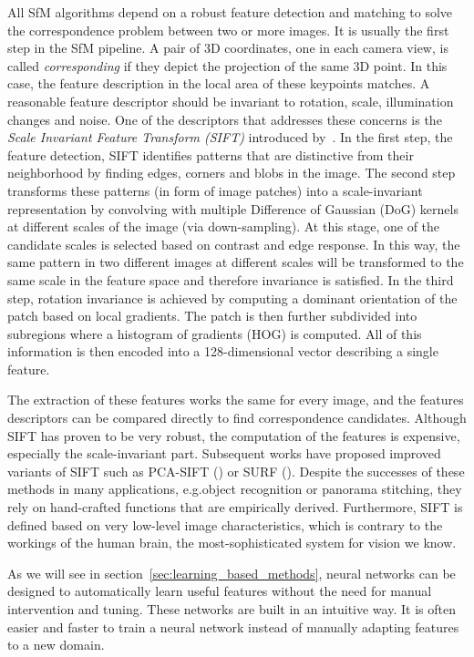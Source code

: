 			All SfM algorithms depend on a robust feature detection and matching to solve the correspondence problem between two or more images.
			It is usually the first step in the SfM pipeline.
			A pair of 3D coordinates, one in each camera view, is called \emph{corresponding} if they depict the projection of the same 3D point.
			In this case, the feature description in the local area of these keypoints matches.
			A reasonable feature descriptor should be invariant to rotation, scale, illumination changes and noise.
			One of the descriptors that addresses these concerns is the \emph{Scale Invariant Feature Transform (SIFT)} introduced by~\cite{lowe1999object}.
			In the first step, the feature detection, SIFT identifies patterns that are distinctive from their neighborhood by finding edges, corners and blobs in the image.
			The second step transforms these patterns (in form of image patches) into a scale-invariant representation by convolving with multiple Difference of Gaussian (DoG) kernels at different scales of the image (via down-sampling).
			At this stage, one of the candidate scales is selected based on contrast and edge response.
			In this way, the same pattern in two different images at different scales will be transformed to the same scale in the feature space and therefore invariance is satisfied.
			In the third step, rotation invariance is achieved by computing a dominant orientation of the patch based on local gradients.
			The patch is then further subdivided into subregions where a histogram of gradients (HOG) is computed.
			All of this information is then encoded into a 128-dimensional vector describing a single feature.
			
			The extraction of these features works the same for every image, and the features descriptors can be compared directly to find correspondence candidates.
			Although SIFT has proven to be very robust, the computation of the features is expensive, especially the scale-invariant part.
			Subsequent works have proposed improved variants of SIFT such as PCA-SIFT (\cite{ke2004pca}) or SURF (\cite{bay2006surf}).
			Despite the successes of these methods in many applications, e.g.\@ object recognition or panorama stitching, they rely on hand-crafted functions that are empirically derived.
			Furthermore, SIFT is defined based on very low-level image characteristics, which is contrary to the workings of the human brain, the most-sophisticated system for vision we know.
			
			As we will see in section~\ref{sec:learning_based_methods}, neural networks can be designed to automatically learn useful features without the need for manual intervention and tuning.
			These networks are built in an intuitive way.
			It is often easier and faster to train a neural network instead of manually adapting features to a new domain.

